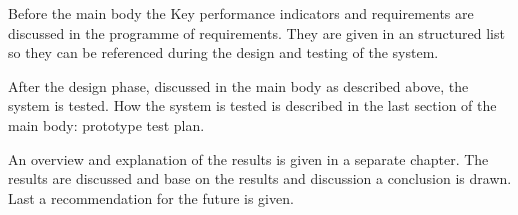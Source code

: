 Before the main body the Key performance indicators and requirements are discussed in the programme of requirements.
They are given in an structured list so they can be referenced during the design and testing of the system.

After the design phase, discussed in the main body as described above, the system is tested.
How the system is tested is described in the last section of the main body: prototype test plan.

An overview and explanation of the results is given in a separate chapter.
The results are discussed and base on the results and discussion a conclusion is drawn.
Last a recommendation for the future is given.
